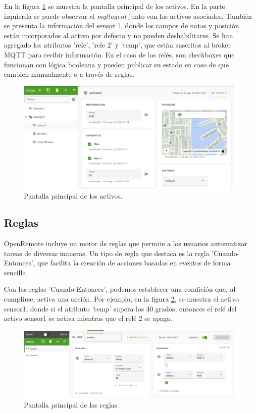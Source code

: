 En la figura \ref{fig:activo_prin} se muestra la pantalla principal de los activos. En la parte izquierda se puede observar el \textit{mqttagent} junto con los activos asociados. También se presenta la información del sensor 1, donde los campos de notas y posición están incorporados al activo por defecto y no pueden deshabilitarse. Se han agregado los atributos 'rele', 'rele 2' y 'temp', que están suscritos al broker MQTT para recibir información. En el caso de los relés, son checkboxes que funcionan con lógica booleana y pueden publicar su estado en caso de que cambien manualmente o a través de reglas.

\begin{figure}[H]
\centering 
\includegraphics[width=1\textwidth]{./Figures/activo_prin.png}
\caption{Pantalla principal de los activos.}
\label{fig:activo_prin}
\end{figure}        


\subsection{Reglas}

OpenRemote incluye un motor de reglas que permite a los usuarios automatizar tareas de diversas maneras. Un tipo de regla que destaca es la regla 'Cuando-Entonces', que facilita la creación de acciones basadas en eventos de forma sencilla.

Con las reglas 'Cuando-Entonces', podemos establecer una condición que, al cumplirse, activa una acción. Por ejemplo, en la figura \ref{fig:reglas}, se muestra el activo sensor1, donde si el atributo 'temp' supera los 40 grados, entonces el relé del activo sensor1 se activa mientras que el relé 2 se apaga.

\begin{figure}[H]
\centering 
\includegraphics[width=1\textwidth]{./Figures/reglas.png}
\caption{Pantalla principal de las reglas.}
\label{fig:reglas}
\end{figure}      

